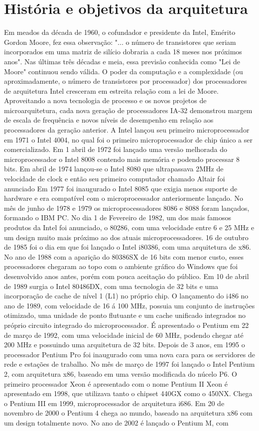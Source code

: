 \documentclass[12pt,a4paper,brazilian,utf8]{ppgsi}
\begin{document}
\section{História e objetivos da arquitetura}
    Em meados da década de 1960, o cofundador e presidente da Intel, Emérito Gordon Moore, fez essa observação: "... o número de transistores que seriam incorporados em uma matriz de silício dobraria a cada 18 meses nos próximos anos". Nas últimas três décadas e meia, essa previsão conhecida como "Lei de Moore" continuou sendo válida. O poder da computação e a complexidade (ou aproximadamente, o número de transistores por processador) dos processadores de arquitetura Intel cresceram em estreita relação com a lei de Moore. Aproveitando a nova tecnologia de processo e os novos projetos de microarquitetura, cada nova geração de processadores IA-32 demonstrou margem de escala de frequência e novos níveis de desempenho em relação aos processadores da geração anterior. A Intel lançou seu primeiro microprocessador em 1971 o Intel 4004, no qual foi o primeiro microprocessador de chip único a ser comercializado. Em 1 abril de 1972 foi lançado uma versão melhorada do microprocessador o Intel 8008 contendo mais memória e podendo processar 8 bits. Em abril de 1974 lançou-se o Intel 8080 que ultrapassava 2MHz de velocidade de clock e então seu primeiro computador chamado Altair foi anunciado Em 1977 foi inaugurado o Intel 8085 que exigia menos suporte de hardware e era compatível com o microprocessador anteriormente lançado. No mês de junho de 1978 e 1979 os microprocessadores 8086 e 8088 foram lançados, formando o IBM PC. No dia 1 de Fevereiro de 1982, um dos mais famosos produtos da Intel foi anunciado, o 80286, com uma velocidade entre 6 e 25 MHz e um design muito mais próximo ao dos atuais microprocessadores. 16 de outubro de 1985 foi o dia em que foi lançado o Intel i80386, com uma arquitetura de x86. No ano de 1988 com a aparição do 80386SX de 16 bits com menor custo, esses processadores chegaram ao topo com o ambiente gráfico do Windows que foi desenvolvido anos antes, porém com pouca aceitação do público. Em 10 de abril de 1989 surgia o Intel 80486DX, com uma tecnologia de 32 bits e uma incorporação de cache de nível 1 (L1) no próprio chip. O lançamento do i486 no ano de 1989, com velocidade de 16 á 100 MHz, possuia um conjunto de instruções otimizado, uma unidade de ponto flutuante e um cache unificado integrados no próprio circuito integrado do microprocessador. É apresentado o Pentium em 22 de março de 1992, com uma velocidade inicial de 60 MHz, podendo chegar até 200 MHz e possuindo uma arquitetura de 32 bits. Depois de 3 anos, em 1995 o processador Pentium Pro foi inaugurado com uma nova cara para os servidores de rede  e estações de trabalho. No mês de março de 1997 foi lançado o Intel Pentium 2, com arquitetura x86, baseado em uma versão modificada do núcelo P6. O primeiro processador Xeon é apresentado com o nome Pentium II Xeon é apresentado em 1998, que utilizava tanto o chipset 440GX como o 450NX. Chega o Pentium III em 1999, microprocessador de arquitetura i686. Em 20 de novembro de 2000 o Pentium 4 chega ao mundo, baseado na arquitetura x86 com um design totalmente novo. No ano de 2002 é lançado o Pentium M, com 
\end{document}
